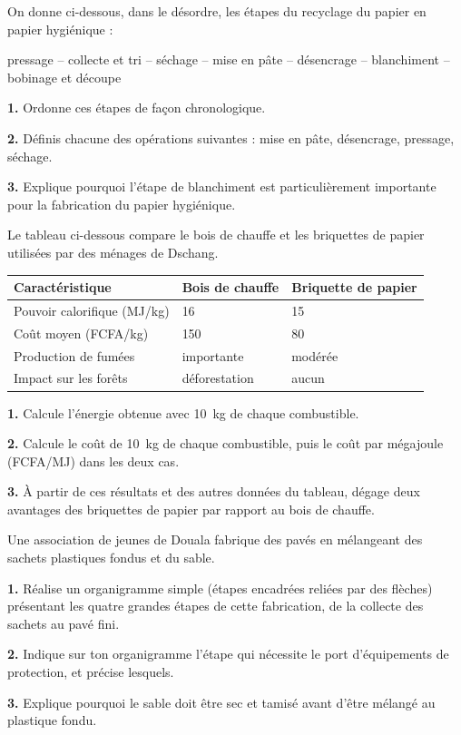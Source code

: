 \documentclass[11pt]{article}
\begin{document}
\begin{exercice}
On donne ci-dessous, dans le désordre, les étapes du recyclage du papier en papier hygiénique :
\begin{center}
pressage -- collecte et tri -- séchage -- mise en pâte -- désencrage -- blanchiment -- bobinage et découpe
\end{center}

\textbf{1.} Ordonne ces étapes de façon chronologique.

\textbf{2.} Définis chacune des opérations suivantes : mise en pâte, désencrage, pressage, séchage.

\textbf{3.} Explique pourquoi l'étape de blanchiment est particulièrement importante pour la fabrication du papier hygiénique.
\end{exercice}

\begin{exercice}
Le tableau ci-dessous compare le bois de chauffe et les briquettes de papier utilisées par des ménages de Dschang.

\begin{center}
\begin{tabularx}{\linewidth}{|l|X|X|}
\hline
\rowcolor{popblueL} \textbf{Caractéristique} & \textbf{Bois de chauffe} & \textbf{Briquette de papier} \\
\hline
Pouvoir calorifique (\si{MJ/kg}) & 16 & 15 \\
\hline
Coût moyen (FCFA/kg) & 150 & 80 \\
\hline
Production de fumées & importante & modérée \\
\hline
Impact sur les forêts & déforestation & aucun \\
\hline
\end{tabularx}
\end{center}

\textbf{1.} Calcule l'énergie obtenue avec \SI{10}{kg} de chaque combustible.

\textbf{2.} Calcule le coût de \SI{10}{kg} de chaque combustible, puis le coût par mégajoule (FCFA/MJ) dans les deux cas.

\textbf{3.} À partir de ces résultats et des autres données du tableau, dégage deux avantages des briquettes de papier par rapport au bois de chauffe.
\end{exercice}

\begin{exercice}
Une association de jeunes de Douala fabrique des pavés en mélangeant des sachets plastiques fondus et du sable.

\textbf{1.} Réalise un organigramme simple (étapes encadrées reliées par des flèches) présentant les quatre grandes étapes de cette fabrication, de la collecte des sachets au pavé fini.

\textbf{2.} Indique sur ton organigramme l'étape qui nécessite le port d'équipements de protection, et précise lesquels.

\textbf{3.} Explique pourquoi le sable doit être sec et tamisé avant d'être mélangé au plastique fondu.
\end{exercice}
\end{document}

